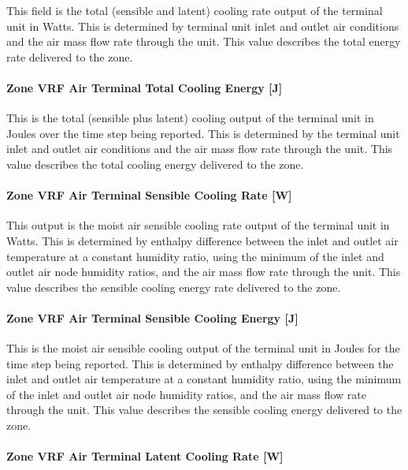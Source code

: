 This field is the total (sensible and latent) cooling rate output of the terminal unit in Watts. This is determined by terminal unit inlet and outlet air conditions and the air mass flow rate through the unit. This value describes the total energy rate delivered to the zone.

\paragraph{Zone VRF Air Terminal Total Cooling Energy {[}J{]}}\label{zone-vrf-air-terminal-total-cooling-energy-j}

This is the total (sensible plus latent) cooling output of the terminal unit in Joules over the time step being reported. This is determined by the terminal unit inlet and outlet air conditions and the air mass flow rate through the unit. This value describes the total cooling energy delivered to the zone.

\paragraph{Zone VRF Air Terminal Sensible Cooling Rate {[}W{]}}\label{zone-vrf-air-terminal-sensible-cooling-rate-w}

This output is the moist air sensible cooling rate output of the terminal unit in Watts. This is determined by enthalpy difference between the inlet and outlet air temperature at a constant humidity ratio, using the minimum of the inlet and outlet air node humidity ratios, and the air mass flow rate through the unit. This value describes the sensible cooling energy rate delivered to the zone.

\paragraph{Zone VRF Air Terminal Sensible Cooling Energy {[}J{]}}\label{zone-vrf-air-terminal-sensible-cooling-energy-j}

This is the moist air sensible cooling output of the terminal unit in Joules for the time step being reported. This is determined by enthalpy difference between the inlet and outlet air temperature at a constant humidity ratio, using the minimum of the inlet and outlet air node humidity ratios, and the air mass flow rate through the unit. This value describes the sensible cooling energy delivered to the zone.

\paragraph{Zone VRF Air Terminal Latent Cooling Rate {[}W{]}}\label{zone-vrf-air-terminal-latent-cooling-rate-w}

